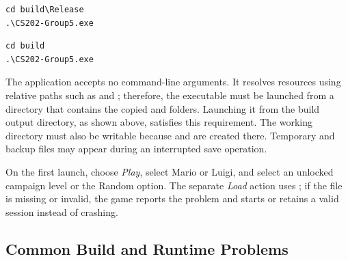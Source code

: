 \documentclass{template}
\begin{document}
\begin{lstlisting}[style=gamecode,numbers=none,caption={Run the MSVC Release build.}]
cd build\Release
.\CS202-Group5.exe
\end{lstlisting}

\begin{lstlisting}[style=gamecode,numbers=none,caption={Run the MinGW or single-configuration Ninja build.}]
cd build
.\CS202-Group5.exe
\end{lstlisting}

The application accepts no command-line arguments. It resolves resources using
relative paths such as  and
; therefore, the executable must be launched from a
directory that contains the copied  and  folders.
Launching it from the build output directory, as shown above, satisfies this
requirement. The working directory must also be writable because
 and  are created there. Temporary
 and backup  files may appear
during an interrupted save operation.

On the first launch, choose \emph{Play}, select Mario or Luigi, and select an
unlocked campaign level or the Random option. The separate \emph{Load} action
uses ; if the file is missing or invalid, the game reports
the problem and starts or retains a valid session instead of crashing.

\subsection{Common Build and Runtime Problems}
\end{document}
